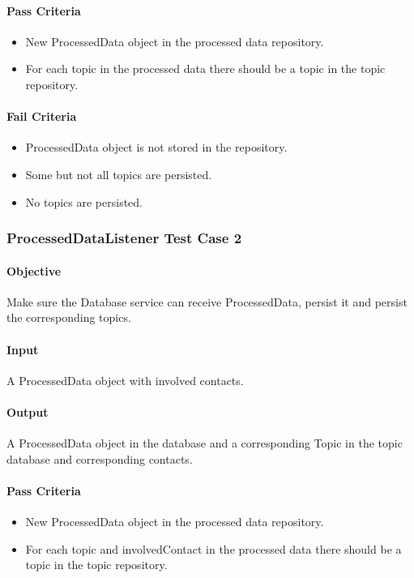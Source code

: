 \documentclass[hidelinks,english]{article}
\begin{document}
				\paragraph{Pass Criteria}
				\begin{itemize}
					\item New ProcessedData object in the processed data repository.
					\item For each topic in the processed data there should be a topic in the topic repository.
				\end{itemize}
				\paragraph{Fail Criteria}
				\begin{itemize}
					\item ProcessedData object is not stored in the repository.
					\item Some but not all topics are persisted.
					\item No topics are persisted.
				\end{itemize}
				
			\subsubsection{ProcessedDataListener Test Case 2}\label{databaseprocesseddatalistenertest2}
				\paragraph{Objective} Make sure the Database service can receive ProcessedData, persist it and persist the corresponding topics.
				\paragraph{Input} A ProcessedData object with involved contacts.
				\paragraph{Output} A ProcessedData object in the database and a corresponding Topic in the topic database and corresponding contacts.
				\paragraph{Pass Criteria}
				\begin{itemize}
					\item New ProcessedData object in the processed data repository.
					\item For each topic and involvedContact in the processed data there should be a topic in the topic repository.
				\end{itemize}
\end{document}
